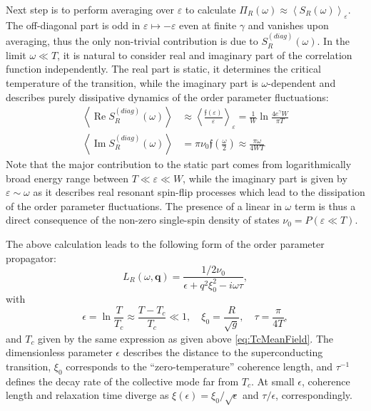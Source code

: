 \documentclass[twocolumn,english,prb]{revtex4-1}
\renewcommand{\Re}{\operatorname{Re}}
\renewcommand{\Im}{\operatorname{Im}}
\begin{document}
Next step is to perform averaging over $\varepsilon$ to calculate  $\Pi_R(\omega) \approx \left\langle S_R(\omega)\right\rangle_{\varepsilon}$. 
The off-diagonal part is odd in $\varepsilon \mapsto -\varepsilon$ even at finite $\gamma$ and vanishes upon averaging, thus the only non-trivial contribution is due to $S_R^{(diag)}(\omega)$.  In the limit $\omega \ll T$, it is natural to consider real and imaginary part of the correlation function independently. The real part is static, it  determines the critical temperature of the transition, while the imaginary part is $\omega$-dependent and describes  purely dissipative dynamics of the order parameter fluctuations:
\begin{align}
\left\langle \Re S_{R}^{(diag)}(\omega)\right\rangle &
\approx\left\langle \frac{\mathfrak{f}(\varepsilon)}{\varepsilon}\right\rangle_{\varepsilon} 
=\frac{1}{W}\ln\frac{4e^{\gamma}W}{\pi T}\\
\left\langle \Im S_{R}^{(diag)}(\omega)\right\rangle &=\pi \nu_0 \mathfrak{f}\left(\frac{\omega}{2}\right)\approx\frac{\pi\omega}{4WT}
\end{align}
Note that the major contribution to the static part comes from logarithmically broad energy range  between $T \ll \varepsilon \ll W$, while the imaginary part is given by $\varepsilon \sim \omega$ as it describes  real resonant spin-flip processes which lead to the dissipation of the order parameter fluctuations. The presence of a linear in $\omega$ term is thus a direct consequence of the non-zero single-spin density of states $\nu_0 = P(\varepsilon \ll T)$.

The above calculation leads to the following form of the order parameter propagator:
\begin{equation}
\label{eq:OrderParameterPropagator}
L_{R}(\omega,\boldsymbol{q}) = \frac{1 / 2 \nu_0}{\epsilon + q^2 \xi_0^2 - i\omega\tau},
\end{equation}
with
\begin{equation}
\label{GLparameters}
\epsilon = \ln\frac{T}{T_c}\approx \frac{T - T_c}{T_c} \ll 1, \quad \xi_0 = \frac{R}{\sqrt{g}},\quad \tau = \frac{\pi}{4 T},
\end{equation}
and $T_c$ given by the same expression as given above \eqref{eq:TcMeanField}. 
The dimensionless parameter $\epsilon$ describes the distance to the superconducting transition, $\xi_0$ corresponds to the ``zero-temperature'' coherence length, and $\tau^{-1}$ defines  the decay rate of the collective mode far from $T_c$.  At small $\epsilon$, coherence length  and 
relaxation time diverge as $\xi(\epsilon) = \xi_0 / \sqrt{\epsilon}$ and $ \tau/\epsilon $, correspondingly.
\end{document}
